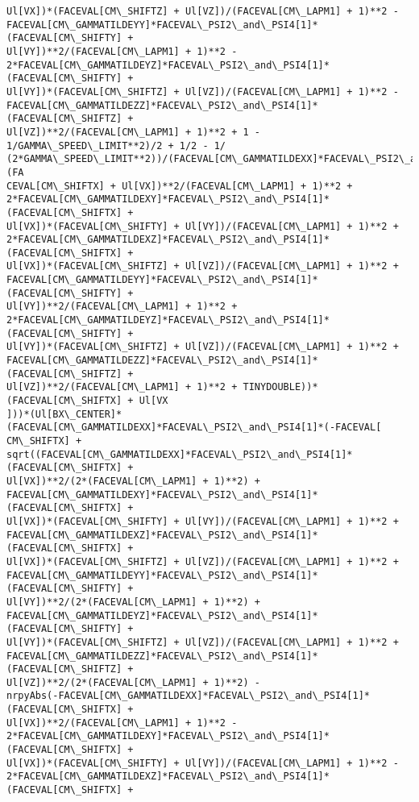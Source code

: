 \documentclass[landscape,letterpaper,10pt,english]{article}
\begin{document}
\begin{Verbatim}[commandchars=\\\{\}]
Ul[VX])*(FACEVAL[CM\_SHIFTZ] + Ul[VZ])/(FACEVAL[CM\_LAPM1] + 1)**2 -
FACEVAL[CM\_GAMMATILDEYY]*FACEVAL\_PSI2\_and\_PSI4[1]*(FACEVAL[CM\_SHIFTY] +
Ul[VY])**2/(FACEVAL[CM\_LAPM1] + 1)**2 -
2*FACEVAL[CM\_GAMMATILDEYZ]*FACEVAL\_PSI2\_and\_PSI4[1]*(FACEVAL[CM\_SHIFTY] +
Ul[VY])*(FACEVAL[CM\_SHIFTZ] + Ul[VZ])/(FACEVAL[CM\_LAPM1] + 1)**2 -
FACEVAL[CM\_GAMMATILDEZZ]*FACEVAL\_PSI2\_and\_PSI4[1]*(FACEVAL[CM\_SHIFTZ] +
Ul[VZ])**2/(FACEVAL[CM\_LAPM1] + 1)**2 + 1 - 1/GAMMA\_SPEED\_LIMIT**2)/2 + 1/2 - 1/
(2*GAMMA\_SPEED\_LIMIT**2))/(FACEVAL[CM\_GAMMATILDEXX]*FACEVAL\_PSI2\_and\_PSI4[1]*(FA
CEVAL[CM\_SHIFTX] + Ul[VX])**2/(FACEVAL[CM\_LAPM1] + 1)**2 +
2*FACEVAL[CM\_GAMMATILDEXY]*FACEVAL\_PSI2\_and\_PSI4[1]*(FACEVAL[CM\_SHIFTX] +
Ul[VX])*(FACEVAL[CM\_SHIFTY] + Ul[VY])/(FACEVAL[CM\_LAPM1] + 1)**2 +
2*FACEVAL[CM\_GAMMATILDEXZ]*FACEVAL\_PSI2\_and\_PSI4[1]*(FACEVAL[CM\_SHIFTX] +
Ul[VX])*(FACEVAL[CM\_SHIFTZ] + Ul[VZ])/(FACEVAL[CM\_LAPM1] + 1)**2 +
FACEVAL[CM\_GAMMATILDEYY]*FACEVAL\_PSI2\_and\_PSI4[1]*(FACEVAL[CM\_SHIFTY] +
Ul[VY])**2/(FACEVAL[CM\_LAPM1] + 1)**2 +
2*FACEVAL[CM\_GAMMATILDEYZ]*FACEVAL\_PSI2\_and\_PSI4[1]*(FACEVAL[CM\_SHIFTY] +
Ul[VY])*(FACEVAL[CM\_SHIFTZ] + Ul[VZ])/(FACEVAL[CM\_LAPM1] + 1)**2 +
FACEVAL[CM\_GAMMATILDEZZ]*FACEVAL\_PSI2\_and\_PSI4[1]*(FACEVAL[CM\_SHIFTZ] +
Ul[VZ])**2/(FACEVAL[CM\_LAPM1] + 1)**2 + TINYDOUBLE))*(FACEVAL[CM\_SHIFTX] + Ul[VX
]))*(Ul[BX\_CENTER]*(FACEVAL[CM\_GAMMATILDEXX]*FACEVAL\_PSI2\_and\_PSI4[1]*(-FACEVAL[
CM\_SHIFTX] +
sqrt((FACEVAL[CM\_GAMMATILDEXX]*FACEVAL\_PSI2\_and\_PSI4[1]*(FACEVAL[CM\_SHIFTX] +
Ul[VX])**2/(2*(FACEVAL[CM\_LAPM1] + 1)**2) +
FACEVAL[CM\_GAMMATILDEXY]*FACEVAL\_PSI2\_and\_PSI4[1]*(FACEVAL[CM\_SHIFTX] +
Ul[VX])*(FACEVAL[CM\_SHIFTY] + Ul[VY])/(FACEVAL[CM\_LAPM1] + 1)**2 +
FACEVAL[CM\_GAMMATILDEXZ]*FACEVAL\_PSI2\_and\_PSI4[1]*(FACEVAL[CM\_SHIFTX] +
Ul[VX])*(FACEVAL[CM\_SHIFTZ] + Ul[VZ])/(FACEVAL[CM\_LAPM1] + 1)**2 +
FACEVAL[CM\_GAMMATILDEYY]*FACEVAL\_PSI2\_and\_PSI4[1]*(FACEVAL[CM\_SHIFTY] +
Ul[VY])**2/(2*(FACEVAL[CM\_LAPM1] + 1)**2) +
FACEVAL[CM\_GAMMATILDEYZ]*FACEVAL\_PSI2\_and\_PSI4[1]*(FACEVAL[CM\_SHIFTY] +
Ul[VY])*(FACEVAL[CM\_SHIFTZ] + Ul[VZ])/(FACEVAL[CM\_LAPM1] + 1)**2 +
FACEVAL[CM\_GAMMATILDEZZ]*FACEVAL\_PSI2\_and\_PSI4[1]*(FACEVAL[CM\_SHIFTZ] +
Ul[VZ])**2/(2*(FACEVAL[CM\_LAPM1] + 1)**2) -
nrpyAbs(-FACEVAL[CM\_GAMMATILDEXX]*FACEVAL\_PSI2\_and\_PSI4[1]*(FACEVAL[CM\_SHIFTX] +
Ul[VX])**2/(FACEVAL[CM\_LAPM1] + 1)**2 -
2*FACEVAL[CM\_GAMMATILDEXY]*FACEVAL\_PSI2\_and\_PSI4[1]*(FACEVAL[CM\_SHIFTX] +
Ul[VX])*(FACEVAL[CM\_SHIFTY] + Ul[VY])/(FACEVAL[CM\_LAPM1] + 1)**2 -
2*FACEVAL[CM\_GAMMATILDEXZ]*FACEVAL\_PSI2\_and\_PSI4[1]*(FACEVAL[CM\_SHIFTX] +

\end{Verbatim}
\end{document}
